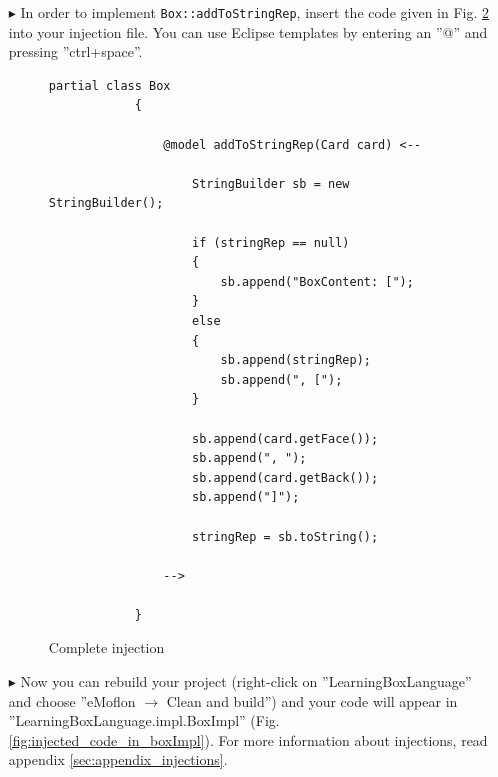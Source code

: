 \begin{enumerate}
    []{Java}{
        morekeywords={partial, class},
        sensitive=false,
        keywordstyle={\bfseries\color{purple}},
        emph={@model},
        emphstyle={\color{blue}},
        backgroundcolor=\color{white}
    }

    \begin{figure}[htbp]
        \centering
        \begin{lstlisting}[language=Injection]
            partial class Box
            {

            }
        \end{lstlisting}
        \caption{Empty injection}
        \label{code:empty_inject_file}
    \end{figure}
    \FloatBarrier

    \item[$\blacktriangleright$]In order to implement \texttt{Box::addToStringRep}, insert the code given in Fig. \ref{code:complete_inject_file} into your injection file. You can use Eclipse templates by entering an ''@'' and pressing ''ctrl+space''.

    \begin{figure}[htbp]
        \centering
        \begin{lstlisting}[language=Injection]
            partial class Box
            {

                @model addToStringRep(Card card) <--

                    StringBuilder sb = new StringBuilder();

                    if (stringRep == null)
                    {
                        sb.append("BoxContent: [");
                    }
                    else
                    {
                        sb.append(stringRep);
                        sb.append(", [");
                    }

                    sb.append(card.getFace());
                    sb.append(", ");
                    sb.append(card.getBack());
                    sb.append("]");

                    stringRep = sb.toString();

                -->

            }
        \end{lstlisting}
        \caption{Complete injection}
        \label{code:complete_inject_file}
    \end{figure}
    \FloatBarrier
    \item[$\blacktriangleright$] Now you can rebuild your project (right-click on ''LearningBoxLanguage'' and choose ''eMoflon $\rightarrow$ Clean and build'') and your code will appear in ''LearningBoxLanguage.impl.BoxImpl'' (Fig. \ref{fig:injected_code_in_boxImpl}). For more information about injections, read appendix \ref{sec:appendix_injections}.

\end{enumerate}

